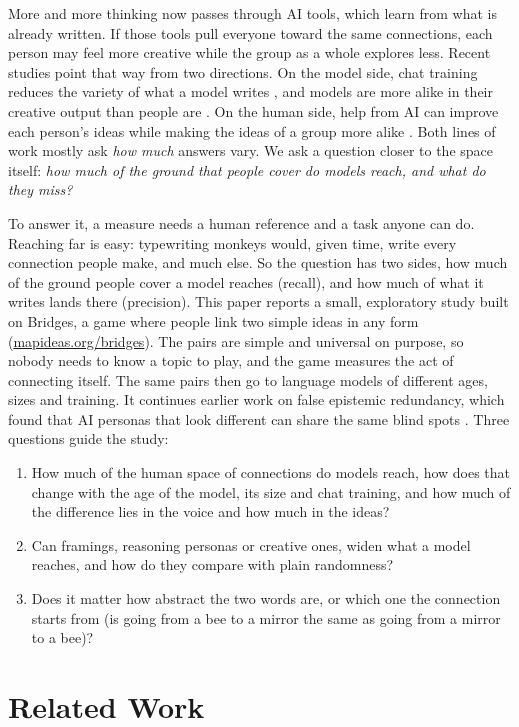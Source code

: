 \documentclass[11pt]{article}
\begin{document}
More and more thinking now passes through AI tools, which learn from what is already written. If those tools pull everyone toward the same connections, each person may feel more creative while the group as a whole explores less. Recent studies point that way from two directions. On the model side, chat training reduces the variety of what a model writes \citep{kirk2024}, and models are more alike in their creative output than people are \citep{wenger2026}. On the human side, help from AI can improve each person's ideas while making the ideas of a group more alike \citep{doshi2024,anderson2024}. Both lines of work mostly ask \emph{how much} answers vary. We ask a question closer to the space itself: \emph{how much of the ground that people cover do models reach, and what do they miss?}

To answer it, a measure needs a human reference and a task anyone can do. Reaching far is easy: typewriting monkeys would, given time, write every connection people make, and much else. So the question has two sides, how much of the ground people cover a model reaches (recall), and how much of what it writes lands there (precision). This paper reports a small, exploratory study built on Bridges, a game where people link two simple ideas in any form (\href{https://mapideas.org/bridges}{mapideas.org/bridges}). The pairs are simple and universal on purpose, so nobody needs to know a topic to play, and the game measures the act of connecting itself. The same pairs then go to language models of different ages, sizes and training. It continues earlier work on false epistemic redundancy, which found that AI personas that look different can share the same blind spots \citep{gallego2026fer}. Three questions guide the study:
\begin{enumerate}[itemsep=0.1em]
\item How much of the human space of connections do models reach, how does that change with the age of the model, its size and chat training, and how much of the difference lies in the voice and how much in the ideas?
\item Can framings, reasoning personas or creative ones, widen what a model reaches, and how do they compare with plain randomness?
\item Does it matter how abstract the two words are, or which one the connection starts from (is going from a bee to a mirror the same as going from a mirror to a bee)?
\end{enumerate}

\section{Related Work}
\label{sec:related}
\end{document}
